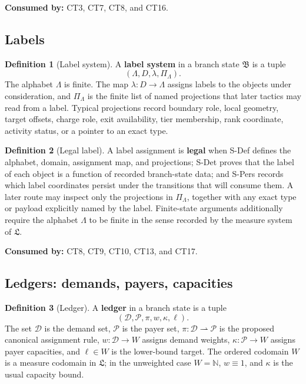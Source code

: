 \documentclass[
  11pt,
]{article}
\theoremstyle{definition}
\newtheorem{definition}{Definition}[section]
\begin{document}
\noindent\textbf{Consumed by:} CT3, CT7, CT8, and CT16.

\subsection{Labels}\label{data-labels}
\begin{definition}[Label system]\label{def:label-system}
A \textbf{label system} in a branch state \(\mathfrak B\) is a tuple
\[
(\Lambda,D,\lambda,\Pi_\Lambda).
\]
The alphabet \(\Lambda\) is finite.  The map
\(\lambda:D\to\Lambda\) assigns labels to the
objects under consideration, and \(\Pi_\Lambda\) is the finite list of
named projections that later tactics may read from a label.  Typical
projections record boundary role, local geometry, target offsets,
charge role, exit availability, tier membership, rank coordinate,
activity status, or a pointer to an exact type.
\end{definition}

\begin{definition}[Legal label]\label{def:legal-label}
A label assignment is \textbf{legal} when S-Def defines the alphabet,
domain, assignment map, and projections; S-Det proves that the label of
each object is a function of recorded branch-state data; and S-Pers
records which label coordinates persist under the transitions that will
consume them.  A later route may inspect only the projections in
\(\Pi_\Lambda\), together with any exact type or payload explicitly
named by the label.  Finite-state arguments additionally require the
alphabet \(\Lambda\) to be finite in the sense recorded by the measure
system of \(\mathfrak L\).
\end{definition}

\noindent\textbf{Consumed by:} CT8, CT9, CT10, CT13, and CT17.

\subsection{Ledgers: demands, payers, capacities}\label{data-ledgers}
\begin{definition}[Ledger]\label{def:ledger}
A \textbf{ledger} in a branch state is a tuple
\[
(\mathcal D,\mathcal P,\pi,w,\kappa,\ell).
\]
The set \(\mathcal D\) is the demand set, \(\mathcal P\) is the payer
set, \(\pi:\mathcal D\rightharpoonup\mathcal P\) is the proposed
canonical assignment rule,
\(w:\mathcal D\to W\) assigns demand weights, \(\kappa:\mathcal P\to W\)
assigns payer capacities, and \(\ell\in W\) is the lower-bound target.
The ordered codomain \(W\) is a measure codomain in \(\mathfrak L\);
in the unweighted case \(W=\mathbb N\), \(w\equiv1\), and \(\kappa\) is
the usual capacity bound.
\end{definition}
\end{document}
